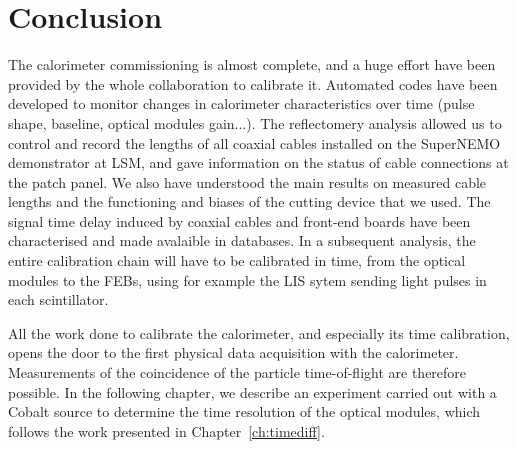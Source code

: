 \section{Conclusion}

The calorimeter commissioning is almost complete, and a huge effort have been provided by the whole collaboration to calibrate it.
Automated codes have been developed to monitor changes in calorimeter characteristics over time (pulse shape, baseline, optical modules gain...).
The reflectomery analysis allowed us to control and record the lengths of all coaxial cables installed on the SuperNEMO demonstrator at LSM, and gave information on the status of cable connections at the patch panel.
We also have understood the main results on measured cable lengths and the functioning and biases of the cutting device that we used.
The signal time delay induced by coaxial cables and front-end boards have been characterised and made avalaible in databases.
In a subsequent analysis, the entire calibration chain will have to be calibrated in time, from the optical modules to the FEBs, using for example the LIS sytem sending light pulses in each scintillator.

All the work done to calibrate the calorimeter, and especially its time calibration, opens the door to the first physical data acquisition with the calorimeter.
Measurements of the coincidence of the particle time-of-flight are therefore possible.
In the following chapter, we describe an experiment carried out with a Cobalt source to determine the time resolution of the optical modules, which follows the work presented in Chapter~\ref{ch:timediff}.
